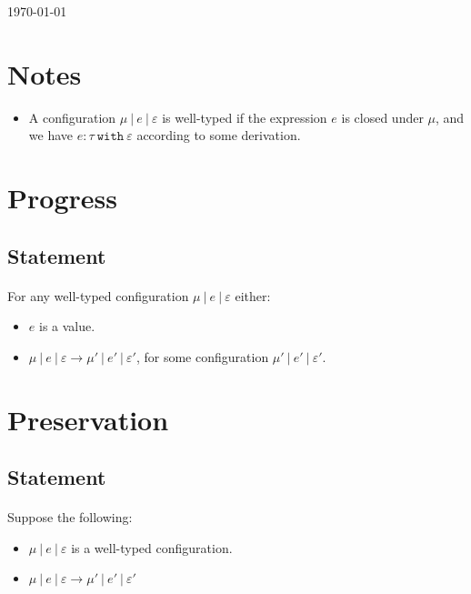 \documentclass{llncs}
\newcommand{\keywadj}[1]{\mathtt{#1}}
\newcommand{\keyw}[1]{\keywadj{#1}~}
\begin{document}
\today

\section{Notes}

\begin{itemize}
	\item A configuration $\mu~|~e~|~\varepsilon$ is well-typed if the expression $e$ is closed under $\mu$, and we have $e :\tau~\keyw{with} \varepsilon$ according to some derivation.
\end{itemize}

\section{Progress}

\subsection{Statement}

\paragraph{}
For any well-typed configuration $\mu~|~e~|~\varepsilon$ either:
\begin{itemize}
	\item $e$ is a value.
	\item $\mu~|~e~|~\varepsilon \longrightarrow \mu'~|~e'~|~\varepsilon'$, for some configuration $\mu'~|~e'~|~\varepsilon'$.
\end{itemize}

\section{Preservation}

\subsection{Statement}

\paragraph{}
Suppose the following:
\begin{itemize}
	\item $\mu~|~e~|~\varepsilon$ is a well-typed configuration.
	\item $\mu~|~e~|~\varepsilon \longrightarrow \mu'~|~e'~|~\varepsilon'$
\end{itemize}
\end{document}
